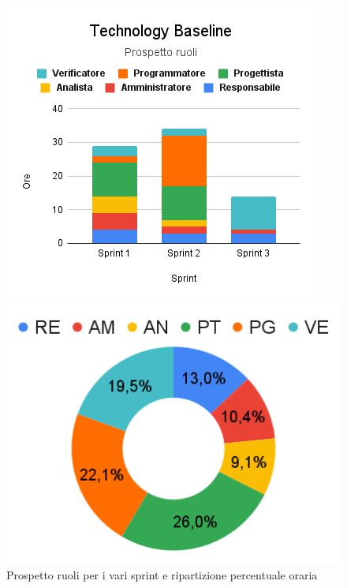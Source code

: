 \begin{figure}[h!]
	\centering
	\begin{minipage}[c]{0.4\textwidth}
    	\includegraphics[scale=0.6]{../../assets/Diagrammi_Excel/Technology Baseline.png}
	\end{minipage}
\hfill
	\begin{minipage}[c]{0.4\textwidth}
		\includegraphics[scale=0.5]{../../assets/Diagrammi_Excel/Rip_tec.png}
	\end{minipage}
	\caption{Prospetto ruoli per i vari sprint e ripartizione percentuale oraria}
\end{figure}


\setlength\extrarowheight{0pt}